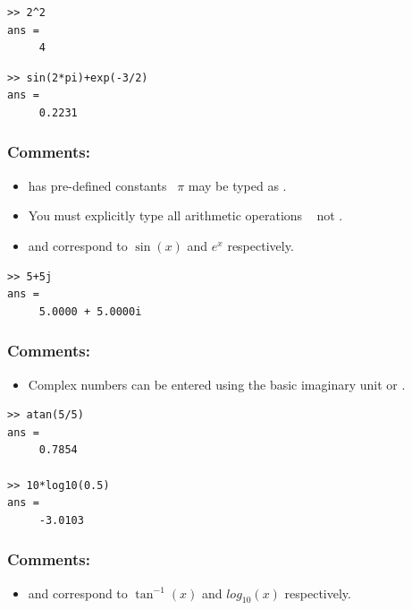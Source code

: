 \begin{lstlisting}[caption={Exponentiation},label=lst:exp]
>> 2^2
ans = 
	 4
\end{lstlisting}	

\begin{lstlisting}[caption={Trigonometry},label=lst:trig1]
>> sin(2*pi)+exp(-3/2)
ans = 
	 0.2231
\end{lstlisting}
\subsubsection{Comments:}
\begin{itemize}
\item \mlab has pre-defined constants \eg\ $\pi$ may be typed as .
\item You must explicitly type all arithmetic operations \eg\  not .
\item {} and  correspond to $\sin(x)$ and $e^x$ respectively.
\end{itemize}

\begin{lstlisting}[caption={Complex numbers},label=lst:complex]
>> 5+5j
ans =
	 5.0000 + 5.0000i
\end{lstlisting}

\subsubsection{Comments:}
\begin{itemize}
\item Complex numbers can be entered using the basic imaginary unit  or .
\end{itemize}

\begin{lstlisting}[caption={More trigonometry},label=lst:trig2]	 
>> atan(5/5)
ans =
	 0.7854
	 
>> 10*log10(0.5)
ans =
	 -3.0103
\end{lstlisting}

\subsubsection{Comments:}
\begin{itemize}
\item {} and  correspond to $\tan^{-1}(x)$ and $log_{10}(x)$ respectively.
\end{itemize}

